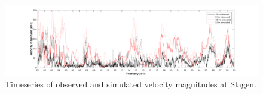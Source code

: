\begin{figure}[htb]
	\centerline{
		\includegraphics*[trim=3cm 0cm 3cm 0cm,clip=true,width=\textwidth]{Figurer/Slagen_tid}}
	\caption{\small Timeseries of observed and simulated velocity magnitudes at Slagen.}
	\label{fig:Slagen-tid}
\end{figure}

